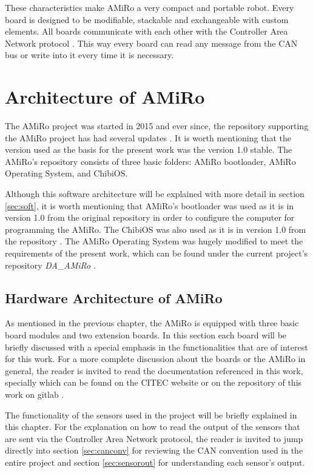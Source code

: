 \documentclass[12pt]{report}%
\begin{document}
These characteristics make AMiRo a very compact and portable robot. Every board is designed to be modifiable, stackable and exchangeable with custom elements. All boards communicate with each other with the Controller Area Network protocol \cite{AMiRo_paper_modular}. This way every board can read any message from the CAN bus or write into it every time it is necessary.

\chapter{Architecture of AMiRo}
The AMiRo project was started in 2015 and ever since, the repository supporting the AMiRo project has had several updates \cite{AMiRo_Wiki}. It is worth mentioning that the version used as the basis for the present work was the version 1.0 stable. The AMiRo's repository consists of three basic folders: AMiRo bootloader, AMiRo Operating System, and ChibiOS.

Although this software architecture will be explained with more detail in section \ref{sec:soft}, it is worth mentioning that AMiRo's bootloader was used as it is in version 1.0 from the original repository in order to configure the computer for programming the AMiRo. The ChibiOS was also used as it is in version 1.0 from the repository \cite{AMiRo_Wiki}. The AMiRo Operating System was hugely modified to meet the requirements of the present work, which can be found under the current project's repository \textit{DA\_AMiRo} \cite{AMiRo_Git}.

\section{Hardware Architecture of AMiRo}
As mentioned in the previous chapter, the AMiRo is equipped with three basic board modules and two extension boards. In this section each board will be briefly discussed with a special emphasis in the functionalities that are of interest for this work. For a more complete discussion about the boards or the AMiRo in general, the reader is invited to read the documentation referenced in this work, specially \cite{AMiRo_paper_verstaile, AMiRo_paper_modular, AMiRo_paper_applications, AMiRo_ppt_v1, AMiRo_ppt_v2} which can be found on the CITEC website or on the repository of this work on gitlab \cite{AMiRo_Git}.

The functionality of the sensors used in the project will be briefly explained in this chapter. For the explanation on how to read the output of the sensors that are sent via the Controller Area Network protocol, the reader is invited to jump directly into section \ref{sec:canconv} for reviewing the CAN convention used in the entire project and section \ref{sec:sensorout} for understanding each sensor's output.
\end{document}
